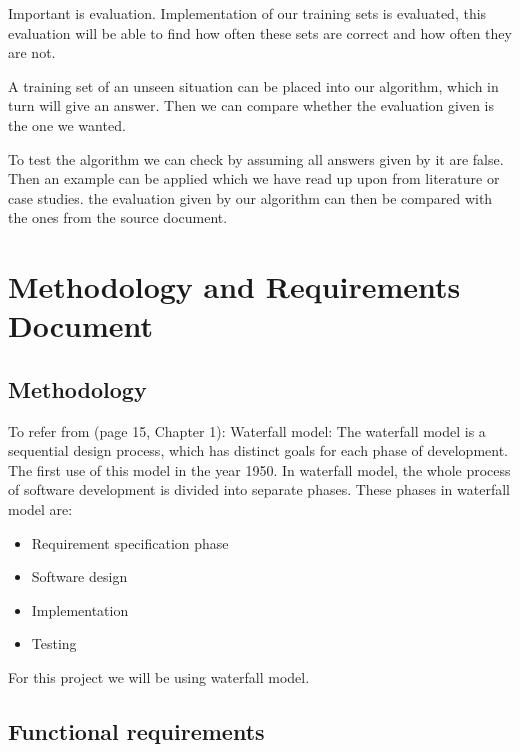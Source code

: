 \documentclass{report}
\begin{document}
Important is evaluation. Implementation of our training sets is evaluated, this evaluation will be able to find how often these sets are correct and how often they are not.

A training set of an unseen situation can be placed into our algorithm, which in turn will give an answer. Then we can compare whether the evaluation given is the one we wanted.

To test the algorithm we can check by assuming all answers given by it are false. Then an example can be applied which we have read up upon from literature or case studies. the evaluation given by our algorithm can then be compared with the ones from the source document.



\chapter{Methodology and Requirements Document}
\label{cha:methrecdoc}

\section{Methodology}
\label{sec:meth}

To refer from \cite{Hamlet2001TheEngineeringofSoftware}(page 15, Chapter 1): Waterfall model: The waterfall model is a sequential design process, which has distinct goals for each phase of development. The first use of this model in the year 1950. In waterfall model, the whole process of software development is divided into separate phases. These phases in waterfall model are:
\begin{itemize}
\item Requirement specification phase
\item Software design
\item Implementation 
\item Testing 

\end{itemize}

For this project we will be using waterfall model. 


\section{Functional requirements}
\label{sec:functreq}
\end{document}
